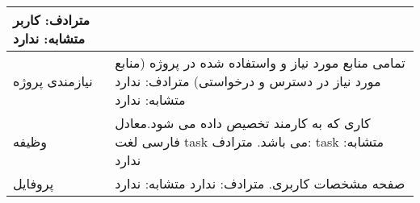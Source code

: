 \begin{tabular}{|p{2cm}|p{10cm}|}
\newline
				مترادف: کاربر
				\newline
				متشابه: ندارد
\\
\hline
نیازمندی پروژه
&
تمامی منابع مورد نیاز و واستفاده شده در پروژه (منابع مورد نیاز در دسترس و
 درخواستی)
 \newline
				مترادف: ندارد
				\newline
				متشابه: ندارد
\\
\hline
وظیفه	
&
کاری که به کارمند تخصیص داده می شود.معادل فارسی لغت task می باشد.
\newline
				مترادف: task
				\newline
				متشابه: ندارد
\\
\hline
پروفایل
&
صفحه مشخصات کاربری.
\newline
				مترادف: ندارد
				\newline
				متشابه: ندارد
				\\
\hline

\end{tabular}
